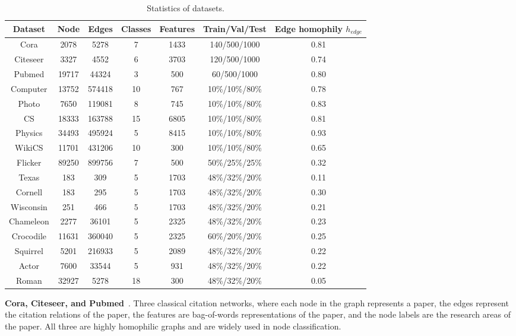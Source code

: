 \documentclass[sigconf]{acmart}
\begin{document}
\begin{table}[ht]
    \centering
        \caption{Statistics of datasets.}
    \begin{tabular}{c|cccccc}
        \toprule
        Dataset  & Node & Edges & Classes &  Features & Train/Val/Test & Edge homophily $h_{edge}$ \\
        \midrule
        Cora &  2078&5278&7&1433&140/500/1000& 0.81\\
        Citeseer &  3327&4552&6&3703&120/500/1000&0.74\\
        Pubmed &   19717& 44324&3& 500&60/500/1000& 0.80\\
        Computer  &   13752 &574418& 10 &767 &10\%/10\%/80\% & 0.78\\
        Photo &  7650&119081&8&745&10\%/10\%/80\% &0.83\\
        CS & 18333&163788&15&6805&10\%/10\%/80\%& 0.81\\
        Physics &  34493&495924&5&8415&10\%/10\%/80\%& 0.93\\
        WikiCS &  11701&431206&10&300&10\%/10\%/80\% & 0.65\\
        Flicker &  89250&899756&7&500&50\%/25\%/25\% & 0.32\\
        Texas &  183&309&5&1703&48\%/32\%/20\% &0.11\\
        Cornell &  183&295&5&1703&48\%/32\%/20\% & 0.30\\
        Wisconsin &  251&466&5&1703&48\%/32\%/20\% & 0.21\\
        Chameleon  &  2277&36101&5&2325&48\%/32\%/20\% &0.23\\
        Crocodile &  11631&360040&5&2325&60\%/20\%/20\% & 0.25\\
        Squirrel &  5201&216933&5&2089&48\%/32\%/20\% & 0.22\\
        Actor &  7600&33544&5&931&48\%/32\%/20\% & 0.22\\
       Roman &32927&5278&18&300&48\%/32\%/20\% &0.05\\
        \bottomrule
    \end{tabular}
    \label{dataset}
\end{table}


\textbf{Cora, Citeseer, and Pubmed}~\cite{citation,gcn}. Three classical citation networks, where each node in the graph represents a paper, the edges represent the citation relations of the paper, the features are bag-of-words representations of the paper, and the node labels are the research areas of the paper. All three are highly homophilic graphs and are widely used in node classification.
\end{document}
